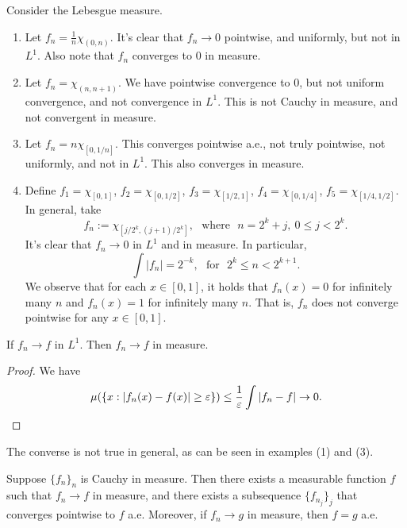 \documentclass[12pt]{article} %
\begin{document}
\begin{example}
    Consider the Lebesgue measure. \begin{enumerate}
        \item Let $f_n = \frac{1}{n} \chi_{(0, n)}$. It's clear that $f_n \to 0$ pointwise, and uniformly, but not in $L^1$. Also note that $f_n$ converges to $0$ in measure.
        \item Let $f_n = \chi_{(n, n+1)}$. We have pointwise convergence to $0$, but not uniform convergence, and not convergence in $L^1$. This is not Cauchy in measure, and not convergent in measure.
        \item Let $f_n = n \chi_{[0, 1/n]}$. This converges pointwise a.e., not truly pointwise, not uniformly, and not in $L^1$. This also converges in measure.
        \item Define $f_1 = \chi_{[0,1]}$, $f_2 = \chi_{[0,1/2]}$, $f_3 = \chi_{[1/2,1]}$, $f_4 = \chi_{[0,1/4]}$, $f_5 = \chi_{[1/4, 1/2]}$. In general, take \[f_n := \chi_{[j / 2^k, (j+1)/2^k]}, \ \ \ \text{where} \ \ \ n = 2^k + j, \ 0 \leq j < 2^k.\] It's clear that $f_n \to 0$ in $L^1$ and in measure. In particular, \[\int |f_n| = 2^{-k}, \ \ \ \text{for} \ \ \ 2^k \leq n < 2^{k+1}.\] We observe that for each $x \in [0,1]$, it holds that $f_n(x) = 0$ for infinitely many $n$ and $f_n(x) = 1$ for infinitely many $n$. That is, $f_n$ does not converge pointwise for any $x \in [0,1]$.
    \end{enumerate}
\end{example}

\begin{proposition}
    If $f_n \to f$ in $L^1$. Then $f_n \to f$ in measure.
\end{proposition}

\begin{proof}
    We have \begin{align*}
        \mu(\{x : |f_n(x) - f(x)| \geq \varepsilon \}) \leq \frac{1}{\varepsilon} \int |f_n - f| \to 0.
    \end{align*}
\end{proof}

\begin{remark}
    The converse is not true in general, as can be seen in examples (1) and (3).
\end{remark}

\begin{theorem}
    Suppose $\{f_n\}_n$ is Cauchy in measure. Then there exists a measurable function $f$ such that $f_n \to f$ in measure, and there exists a subsequence $\{f_{n_j}\}_j$ that converges pointwise to $f$ a.e. Moreover, if $f_n \to g$ in measure, then $f = g$ a.e.
\end{theorem}
\end{document}
